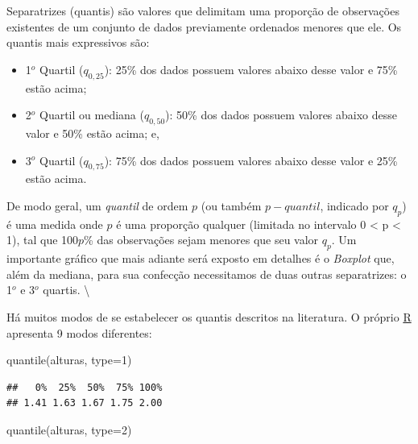 \documentclass[
]{book}
\newenvironment{Shaded}{\begin{snugshade}}{\end{snugshade}}
\newcommand{\AttributeTok}[1]{\textcolor[rgb]{0.77,0.63,0.00}{#1}}
\newcommand{\DecValTok}[1]{\textcolor[rgb]{0.00,0.00,0.81}{#1}}
\newcommand{\FunctionTok}[1]{\textcolor[rgb]{0.00,0.00,0.00}{#1}}
\newcommand{\NormalTok}[1]{#1}
\providecommand{\tightlist}{%
  \setlength{\itemsep}{0pt}\setlength{\parskip}{0pt}}
\begin{document}
\hfill\break

Separatrizes (quantis) são valores que delimitam uma proporção de observações existentes de um conjunto de dados previamente ordenados menores que ele. Os quantis mais expressivos são:

\hfill\break

\begin{itemize}
\tightlist
\item
  1\(^{o}\) Quartil (\(q_{0,25}\)): 25\% dos dados possuem valores abaixo desse valor e 75\% estão acima;
\item
  2\(^{o}\) Quartil ou mediana (\(q_{0,50}\)): 50\% dos dados possuem valores abaixo desse valor e 50\% estão acima; e,
\item
  3\(^{o}\) Quartil (\(q_{0,75}\)): 75\% dos dados possuem valores abaixo desse valor e 25\% estão acima.
\end{itemize}

\hfill\break

De modo geral, um \emph{quantil} de ordem \(p\) (ou também \(p-quantil\), indicado por \(q_{p}\)) é uma medida onde \(p\) é uma proporção qualquer (limitada no intervalo 0 \textless{} p \textless{} 1), tal que 100\(p\)\% das observações sejam menores que seu valor \(q_{p}\). Um importante gráfico que mais adiante será exposto em detalhes é o \emph{Boxplot} que, além da mediana, para sua confecção necessitamos de duas outras separatrizes: o 1\(^{o}\) e 3\(^{o}\) quartis. \textbackslash{}

\hfill\break
Há muitos modos de se estabelecer os quantis descritos na literatura. O próprio \href{https://www.rdocumentation.org/packages/stats/versions/3.6.2/topics/quantile}{R} apresenta 9 modos diferentes:

\hfill\break

\begin{Shaded}
\begin{Highlighting}[]
\FunctionTok{quantile}\NormalTok{(alturas, }\AttributeTok{type=}\DecValTok{1}\NormalTok{)}
\end{Highlighting}
\end{Shaded}

\begin{verbatim}
##   0%  25%  50%  75% 100% 
## 1.41 1.63 1.67 1.75 2.00
\end{verbatim}

\begin{Shaded}
\begin{Highlighting}[]
\FunctionTok{quantile}\NormalTok{(alturas, }\AttributeTok{type=}\DecValTok{2}\NormalTok{)}
\end{Highlighting}
\end{Shaded}
\end{document}
